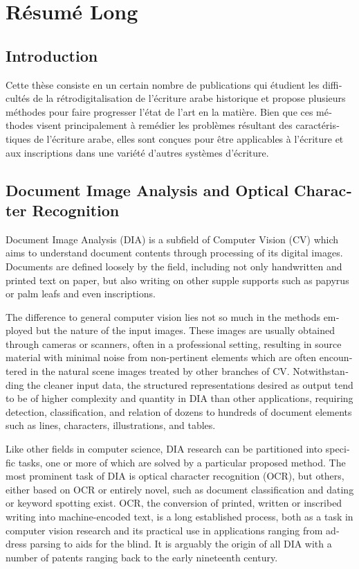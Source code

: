 \chapter{Résumé Long}

\begin{french}

\section{Introduction}

Cette thèse consiste en un certain nombre de publications qui étudient les
difficultés de la rétrodigitalisation de l'écriture arabe historique et propose
plusieurs méthodes pour faire progresser l'état de l'art en la matière. Bien
que ces méthodes visent principalement à remédier les problèmes résultant des
caractéristiques de l'écriture arabe, elles sont conçues pour être applicables
à l'écriture et aux inscriptions dans une variété d'autres systèmes d'écriture.

\section{Document Image Analysis and Optical Character Recognition}

Document Image Analysis (DIA) is a subfield of Computer Vision (CV) which aims
to understand document contents through processing of its digital images.
Documents are defined loosely by the field, including not only handwritten and
printed text on paper, but also writing on other supple supports such as
papyrus or palm leafs and even inscriptions.

The difference to general computer vision lies not so much in the methods
employed but the nature of the input images. These images are usually obtained
through cameras or scanners, often in a professional setting, resulting in
source material with minimal noise from non-pertinent elements which are often
encountered in the natural scene images treated by other branches of CV.
Notwithstanding the cleaner input data, the structured representations desired
as output tend to be of higher complexity and quantity in DIA than other
applications, requiring detection, classification, and relation of dozens to
hundreds of document elements such as lines, characters, illustrations, and
tables. 

Like other fields in computer science, DIA research can be partitioned into
specific tasks, one or more of which are solved by a particular proposed
method. The most prominent task of DIA is optical character recognition (OCR),
but others, either based on OCR or entirely novel, such as document
classification and dating or keyword spotting exist. OCR, the conversion of
printed, written or inscribed writing into machine-encoded text, is a long
established process, both as a task in computer vision research and its
practical use in applications ranging from address parsing to aids for the
blind. It is arguably the origin of all DIA with a number of patents ranging
back to the early nineteenth century.


\end{french}

